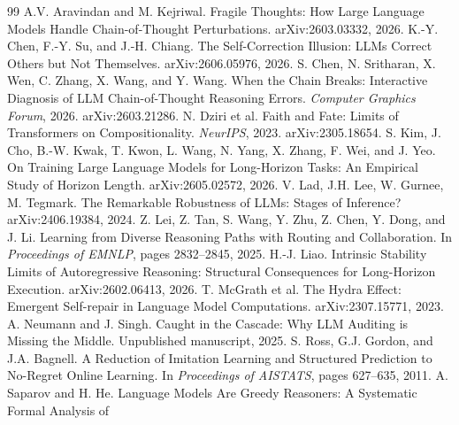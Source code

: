\documentclass{article}
\begin{document}

\begin{thebibliography}{99}
A.V. Aravindan and M. Kejriwal.
\newblock Fragile Thoughts: How Large Language Models Handle Chain-of-Thought
Perturbations.
\newblock arXiv:2603.03332, 2026.
K.-Y. Chen, F.-Y. Su, and J.-H. Chiang.
\newblock The Self-Correction Illusion: LLMs Correct Others but Not Themselves.
\newblock arXiv:2606.05976, 2026.
S. Chen, N. Sritharan, X. Wen, C. Zhang, X. Wang, and Y. Wang.
\newblock When the Chain Breaks: Interactive Diagnosis of LLM Chain-of-Thought
Reasoning Errors.
\newblock \emph{Computer Graphics Forum}, 2026. arXiv:2603.21286.
 N. Dziri et al.
\newblock Faith and Fate: Limits of Transformers on Compositionality.
\newblock \emph{NeurIPS}, 2023. arXiv:2305.18654.
S. Kim, J. Cho, B.-W. Kwak, T. Kwon, L. Wang, N. Yang, X. Zhang, F. Wei,
and J. Yeo.
\newblock On Training Large Language Models for Long-Horizon Tasks: An
Empirical Study of Horizon Length.
\newblock arXiv:2605.02572, 2026.
 V. Lad, J.H. Lee, W. Gurnee, M. Tegmark.
\newblock The Remarkable Robustness of LLMs: Stages of Inference?
\newblock arXiv:2406.19384, 2024.
Z. Lei, Z. Tan, S. Wang, Y. Zhu, Z. Chen, Y. Dong, and J. Li.
\newblock Learning from Diverse Reasoning Paths with Routing and Collaboration.
\newblock In \emph{Proceedings of EMNLP}, pages 2832--2845, 2025.
H.-J. Liao.
\newblock Intrinsic Stability Limits of Autoregressive Reasoning: Structural
Consequences for Long-Horizon Execution.
\newblock arXiv:2602.06413, 2026.
 T. McGrath et al.
\newblock The Hydra Effect: Emergent Self-repair in Language Model Computations.
\newblock arXiv:2307.15771, 2023.
A. Neumann and J. Singh.
\newblock Caught in the Cascade: Why LLM Auditing is Missing the Middle.
\newblock Unpublished manuscript, 2025.
S. Ross, G.J. Gordon, and J.A. Bagnell.
\newblock A Reduction of Imitation Learning and Structured Prediction to
No-Regret Online Learning.
\newblock In \emph{Proceedings of AISTATS}, pages 627--635, 2011.
 A. Saparov and H. He.
\newblock Language Models Are Greedy Reasoners: A Systematic Formal Analysis of

\end{thebibliography}
\end{document}
